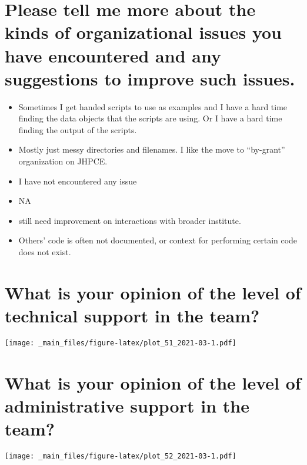 \documentclass[
]{book}
\providecommand{\tightlist}{%
  \setlength{\itemsep}{0pt}\setlength{\parskip}{0pt}}
\begin{document}
\hypertarget{please-tell-me-more-about-the-kinds-of-organizational-issues-you-have-encountered-and-any-suggestions-to-improve-such-issues.-1}{%
\section{Please tell me more about the kinds of organizational issues you have encountered and any suggestions to improve such issues.}\label{please-tell-me-more-about-the-kinds-of-organizational-issues-you-have-encountered-and-any-suggestions-to-improve-such-issues.-1}}

\begin{itemize}
\tightlist
\item
  Sometimes I get handed scripts to use as examples and I have a hard time finding the data objects that the scripts are using. Or I have a hard time finding the output of the scripts.
\item
  Mostly just messy directories and filenames. I like the move to ``by-grant'' organization on JHPCE.
\item
  I have not encountered any issue
\item
  NA
\item
  still need improvement on interactions with broader institute.
\item
  Others' code is often not documented, or context for performing certain code does not exist.
\end{itemize}

\hypertarget{what-is-your-opinion-of-the-level-of-technical-support-in-the-team-1}{%
\section{What is your opinion of the level of technical support in the team?}\label{what-is-your-opinion-of-the-level-of-technical-support-in-the-team-1}}

\texttt{[image: \_main\_files/figure-latex/plot\_51\_2021-03-1.pdf]}

\hypertarget{what-is-your-opinion-of-the-level-of-administrative-support-in-the-team-1}{%
\section{What is your opinion of the level of administrative support in the team?}\label{what-is-your-opinion-of-the-level-of-administrative-support-in-the-team-1}}

\texttt{[image: \_main\_files/figure-latex/plot\_52\_2021-03-1.pdf]}
\end{document}
